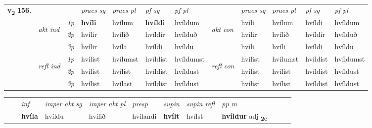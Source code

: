 \begin{tabular}{llllllllllll} \toprule
\multirow{4}{*}{{{\textbf{v{\textsubscript{2}}} \Large{\textbf{156.}}}}}  & &   &  \textit{praes sg}  & \textit{praes pl}  &\textit{ pf sg} & \textit{pf pl} &  &  \textit{praes sg}  & \textit{praes pl}  & \textit{pf sg} & \textit{pf pl } \\*
	\cmidrule{4-7} \cmidrule{9-12}
 & \multirow{3}{*}{\begin{turn}{90}\textit{akt ind}\end{turn}} & {\textit{1p}} & \textbf{hvíli} & hvílum    & \textbf{hvíldi} & hvíldum & \multirow{3}{*}{\begin{turn}{90}\textit{akt con}\end{turn}} &hvíli & hvílum & hvíldi & hvíldum\\*
& &  {\textit{2p}} &  hvílir  & hvílið   & hvíldir & hvílduð & & hvílir & hvílið & hvíldir & hvílduð \\*
& &  {\textit{3p}} & hvílir & hvíla   & hvíldi & hvíldu & & hvíli & hvíli& hvíldi & hvíldu  \\*
\cmidrule{4-7} \cmidrule{9-12}
 &\multirow{3}{*}{\begin{turn}{90}\textit{refl ind}\end{turn}} & {\textit{1p}} & hvílist & hvílumst    & hvíldist & hvíldumst & \multirow{3}{*}{\begin{turn}{90}\textit{refl con}\end{turn}}  &hvílist & hvílumst & hvíldist & hvíldumst\\*
 &&  {\textit{2p}} &  hvílist  & hvílist   & hvíldist & hvíldust & &hvílist & hvílist & hvíldist & hvíldust \\*
& &  {\textit{3p}} & hvílist & hvílast   & hvíldist & hvíldust & & hvílist & hvílist& hvíldist & hvíldust  \\*
\cmidrule{4-7} \cmidrule{9-12}
\end{tabular}


\begin{tabular}{llllllllllll}
 & & \textit{inf} & \textit{imper akt sg} & \textit{imper akt pl}   & \textit{presp} & \textit{supin} & \textit{supin refl} & \textit{pp m}     \\*
  & & \textbf{hvíla} & hvíldu  & hvílið   & hvílandi &  \textbf{hvílt} & hvílst & \textbf{hvíldur} adj \textbf{\textsubscript{2e}} \\*
\cmidrule{1-12}
\end{tabular}



